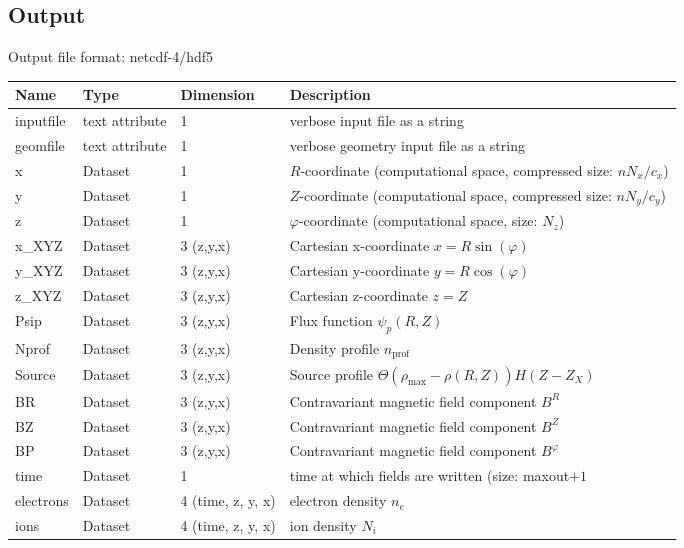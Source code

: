 \subsection{Output}
Output file format: netcdf-4/hdf5
%
\begin{longtable}{lll>{\RaggedRight}p{7cm}}
\toprule
\rowcolor{gray!50}\textbf{Name} &  \textbf{Type} & \textbf{Dimension} & \textbf{Description}  \\ \midrule
inputfile  &     text attribute & 1 & verbose input file as a string \\
geomfile   &     text attribute & 1 & verbose geometry input file as a string \\
x                & Dataset & 1 & $R$-coordinate (computational space, compressed size: $nN_x/c_x$)\\
y                & Dataset & 1 & $Z$-coordinate (computational space, compressed size: $nN_y/c_y$)\\
z                & Dataset & 1 & $\varphi$-coordinate (computational space, size: $N_z$) \\
x\_XYZ           & Dataset & 3 (z,y,x) & Cartesian x-coordinate $x=R\sin(\varphi)$ \\
y\_XYZ           & Dataset & 3 (z,y,x) & Cartesian y-coordinate $y=R\cos(\varphi)$\\
z\_XYZ           & Dataset & 3 (z,y,x) & Cartesian z-coordinate $z=Z$ \\
Psip             & Dataset & 3 (z,y,x) & Flux function $\psi_p(R,Z)$ \\
Nprof            & Dataset & 3 (z,y,x) & Density profile $n_\text{prof}$ \\
Source           & Dataset & 3 (z,y,x) & Source  profile $\Theta(\rho_{\max} - \rho(R,Z)) H(Z-Z_X)$\\
BR               & Dataset & 3 (z,y,x) & Contravariant magnetic field component $B^R$ \\
BZ               & Dataset & 3 (z,y,x) & Contravariant magnetic field component $B^Z$ \\
BP               & Dataset & 3 (z,y,x) & Contravariant magnetic field component $B^\varphi$ \\
time             & Dataset & 1 & time at which fields are written (size: maxout$+1$ \\
electrons        & Dataset & 4 (time, z, y, x) & electron density $n_e$ \\
ions             & Dataset & 4 (time, z, y, x) & ion density $N_i$ \\

\end{longtable}
